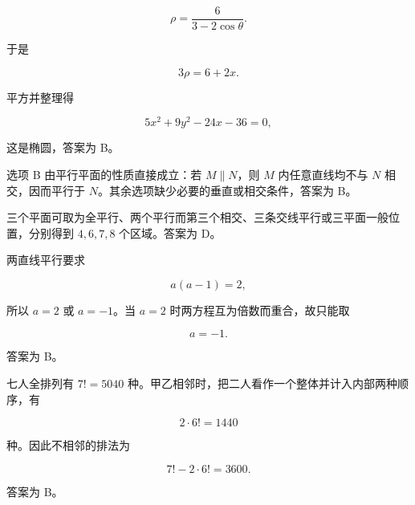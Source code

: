 \begin{answer}
\nopagebreak[4]
\[
\rho=\frac6{3-2\cos\theta}.
\]

于是

\nopagebreak[4]
\[
3\rho=6+2x.
\]

平方并整理得

\nopagebreak[4]
\[
5x^2+9y^2-24x-36=0,
\]

这是椭圆，答案为 B。


选项 B 由平行平面的性质直接成立：若 $M\parallel N$，则 $M$ 内任意直线均不与 $N$ 相交，因而平行于 $N$。其余选项缺少必要的垂直或相交条件，答案为 B。


三个平面可取为全平行、两个平行而第三个相交、三条交线平行或三平面一般位置，分别得到 $4,6,7,8$ 个区域。答案为 D。


两直线平行要求

\nopagebreak[4]
\[
a(a-1)=2,
\]

所以 $a=2$ 或 $a=-1$。当 $a=2$ 时两方程互为倍数而重合，故只能取

\nopagebreak[4]
\[
a=-1.
\]

答案为 B。


七人全排列有 $7!=5040$ 种。甲乙相邻时，把二人看作一个整体并计入内部两种顺序，有

\nopagebreak[4]
\[
2\cdot6!=1440
\]

种。因此不相邻的排法为

\nopagebreak[4]
\[
7!-2\cdot6!=3600.
\]

答案为 B。













\end{answer}
